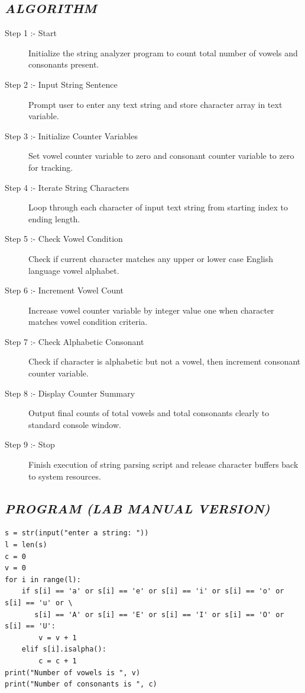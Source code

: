 \documentclass[11pt,a4paper]{article}
\begin{document}
\subsection*{\textit{ALGORITHM}}
\begin{description}
  \item[Step 1 :- Start] Initialize the string analyzer program to count total number of vowels and consonants present.
  \item[Step 2 :- Input String Sentence] Prompt user to enter any text string and store character array in text variable.
  \item[Step 3 :- Initialize Counter Variables] Set vowel counter variable to zero and consonant counter variable to zero for tracking.
  \item[Step 4 :- Iterate String Characters] Loop through each character of input text string from starting index to ending length.
  \item[Step 5 :- Check Vowel Condition] Check if current character matches any upper or lower case English language vowel alphabet.
  \item[Step 6 :- Increment Vowel Count] Increase vowel counter variable by integer value one when character matches vowel condition criteria.
  \item[Step 7 :- Check Alphabetic Consonant] Check if character is alphabetic but not a vowel, then increment consonant counter variable.
  \item[Step 8 :- Display Counter Summary] Output final counts of total vowels and total consonants clearly to standard console window.
  \item[Step 9 :- Stop] Finish execution of string parsing script and release character buffers back to system resources.
\end{description}

\subsection*{\textit{PROGRAM (LAB MANUAL VERSION)}}
\begin{lstlisting}[style=pythonstyle]
s = str(input("enter a string: ")) 
l = len(s) 
c = 0 
v = 0 
for i in range(l): 
    if s[i] == 'a' or s[i] == 'e' or s[i] == 'i' or s[i] == 'o' or s[i] == 'u' or \
       s[i] == 'A' or s[i] == 'E' or s[i] == 'I' or s[i] == 'O' or s[i] == 'U': 
        v = v + 1 
    elif s[i].isalpha(): 
        c = c + 1 
print("Number of vowels is ", v) 
print("Number of consonants is ", c)
\end{lstlisting}
\end{document}

